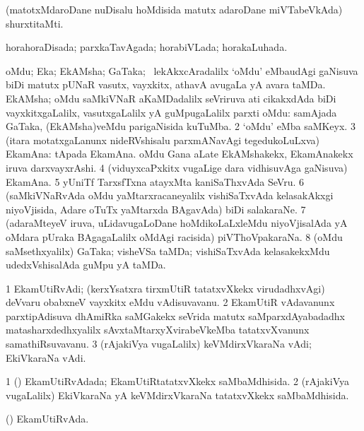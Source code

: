 \bentry
{}
\gl{\nA}
\expl{}
\bmng
(matotxMdaroDane nuDisalu hoMdisida matutx adaroDane miVTabeVkAda) shurxtitaMti. 
\emng
\eentry

\bentry
{} 
\gl{\gu}
\expl{}
\bmng
horahoraDisada; parxkaTavAgada; horabiVLada; horakaLuhada. 
\emng
\eentry

\bentry
{} 
\gl{\nA}
\expl{}
\bmng
\bnum
{} 
\banum
{} oMdu; Eka; EkAMsha; GaTaka; \kanmu\ lekAkxcAradalilx `oMdu' eMbaudAgi gaNisuva biDi matutx pUNaR vasutx, vayxkitx, athavA avugaLa yA avara taMDa. 
 EkAMsha; oMdu saMkiVNaR aKaMDadalilx seVriruva ati cikakxdAda biDi vayxkitxgaLalilx, vasutxgaLalilx yA guMpugaLalilx parxti oMdu:  samAjada GaTaka, (EkAMsha)veMdu parigaNisida kuTuMba. 
\eanum
\numie
\num{2} `oMdu' eMba saMKeyx. 
\num{3} (itara motatxgaLanunx nideRVshisalu parxmANavAgi tegedukoLuLxva) EkamAna:  tApada EkamAna.  oMdu Gana aLate EkAMshakekx, EkamAnakekx iruva darxvayxrAshi. 
\num{4} (viduyxcaPxkitx \mo vugaLige dara vidhisuvAga gaNisuva) EkamAna. 
\num{5} yUniTf TarxsfTxna atayxMta kaniSaThxvAda SeVru. 
\num{6} (saMkiVNaRvAda oMdu yaMtarxracaneyalilx vishiSaTxvAda kelasakAkxgi niyoVjisida, Adare oTuTx yaMtarxda BAgavAda) biDi salakaraNe. 
\num{7} (adaraMteyeV iruva, uLidavugaLoDane hoMdikoLaLxleMdu niyoVjisalAda yA oMdara pUraka BAgagaLalilx oMdAgi racisida) piVThoVpakaraNa. 
\num{8} (oMdu saMsethxyalilx) GaTaka; visheVSa taMDa; vishiSaTxvAda kelasakekxMdu udedxVshisalAda guMpu yA taMDa. 
\enum
\emng
\eentry

\bentry
{} 
\gl{\nA}
\expl{}
\bmng
\bnum
\num{1} EkamUtiRvAdi; (kerxYsatxra tirxmUtiR tatatxvXkekx virudadhxvAgi) deVvaru obabxneV vayxkitx eMdu vAdisuvavanu. 
\num{2} EkamUtiR vAdavanunx parxtipAdisuva dhAmiRka saMGakekx seVrida matutx saMparxdAyabadadhx matasharxdedhxyalilx sAvxtaMtarxyXvirabeVkeMba tatatxvXvanunx samathiRsuvavanu. 
\num{3} (rAjakiVya \mo vugaLalilx) keVMdirxVkaraNa vAdi; EkiVkaraNa vAdi. 
\enum
\emng
\eentry

\bentry
{} 
\gl{\gu}
\expl{}
\bmng
\bnum
\num{1} (\kerxY) EkamUtiRvAdada; EkamUtiRtatatxvXkekx saMbaMdhisida. 
\num{2} (rAjakiVya \mo vugaLalilx) EkiVkaraNa yA keVMdirxVkaraNa tatatxvXkekx saMbaMdhisida. 
\enum
\emng
\eentry

\bentry
{} 
\gl{\nA}
\expl{}
\bmng
(\kerxY) EkamUtiRvAda. 
\emng
\eentry

